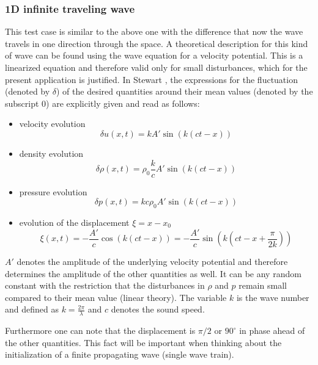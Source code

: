 \documentclass{report}
\begin{document}
\subsubsection{1D infinite traveling wave}
This test case is similar to the above one with the difference that now the wave travels in one direction through the space. A theoretical description for this kind of wave can be found using the wave equation for a velocity potential. This is a linearized equation and therefore valid only for small disturbances, which for the present application is justified. In Stewart \cite{Stewart1930}, the expressions for the fluctuation (denoted by $\delta$) of the desired quantities around their mean values (denoted by the subscript $0$) are explicitly given and read as follows:
\begin{itemize}
\item velocity evolution 
\begin{equation}
\label{eq:1DWaveDetla_u}
 \delta u(x,t)=k A' \sin(k(ct-x))
\end{equation}
\item density evolution 
\begin{equation}
\label{eq:1DWaveDetla_rho}
 \delta \rho(x,t)=\rho_0\frac{k}{c} A'  \sin(k(ct-x))
\end{equation}
\item pressure evolution 
\begin{equation}
\label{eq:1DWaveDetla_p}
 \delta p(x,t)=k c \rho_0 A'  \sin(k(ct-x))
\end{equation}
\item evolution of the displacement $\xi=x-x_0$
\begin{equation}
\label{eq:1DWaveDisplacement}
 \xi(x,t)=-\frac{A' }{c} \cos(k(ct-x))=-\frac{A' }{c} \sin\left(k\left(ct-x+\frac{\pi}{2k}\right)\right)
\end{equation}

\end{itemize}

$A'$ denotes the amplitude of the underlying velocity potential and therefore determines the amplitude of the other quantities as well. It can be any random constant with the restriction that the disturbances in $\rho$ and $p$ remain small compared to their mean value (linear theory). The variable $k$ is the  wave number and defined as $k=\frac{2\pi}{\lambda}$ and $c$ denotes the sound speed.

Furthermore one can note that the displacement is $\pi/2$ or $90^\circ$ in phase ahead of the other quantities. This fact will be important when thinking about the initialization of a finite propagating wave (single wave train). 
\end{document}
